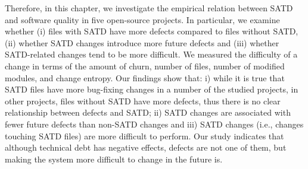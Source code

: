 Therefore, in this chapter, we investigate the empirical relation between SATD and software quality in five open-source projects. In particular, we examine whether (i) files with SATD have more defects compared to files without SATD, (ii) whether SATD changes introduce more future defects and (iii) whether SATD-related changes tend to be more difficult. We measured the difficulty of a change in terms of the amount of churn, number of files, number of modified modules, and change entropy. Our findings show that: i) while it is true that SATD files have more bug-fixing changes in a number of the studied projects, in other projects, files without SATD have more defects, thus there is no clear relationship between defects and SATD; ii) SATD changes are associated with fewer future defects than non-SATD changes and iii) SATD changes (i.e., changes touching SATD files) are more difficult to perform. Our study indicates that although technical debt has negative effects, defects are not one of them, but making the system more difficult to change in the future is.




